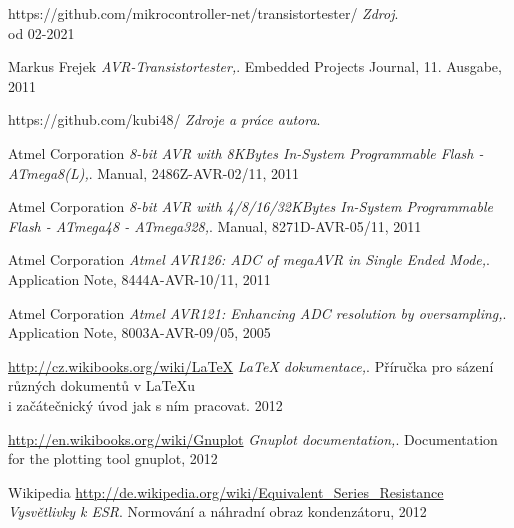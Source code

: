 \documentclass[pdftex,12pt,a4paper,oneside,czech]{report}
\begin{document}












 
 
 
 
 
 






\begin{thebibliography}{99}

https://github.com/mikrocontroller-net/transistortester/
\emph{Zdroj}.
\\od 02-2021

Markus Frejek
\emph{AVR-Transistortester,}.
Embedded Projects Journal,
11. Ausgabe,
2011

https://github.com/kubi48/
\emph{Zdroje a práce autora}.

Atmel Corporation
\emph{8-bit AVR with 8KBytes In-System Programmable Flash - ATmega8(L),}.
Manual,
2486Z-AVR-02/11,
2011

Atmel Corporation
\emph{8-bit AVR with 4/8/16/32KBytes In-System Programmable Flash - ATmega48 - ATmega328,}.
Manual,
8271D-AVR-05/11,
2011

Atmel Corporation
\emph{Atmel AVR126: ADC of megaAVR in Single Ended Mode,}.
Application Note,
8444A-AVR-10/11,
2011

Atmel Corporation
\emph{Atmel AVR121: Enhancing ADC resolution by oversampling,}.
Application Note,
8003A-AVR-09/05,
2005

\url{http://cz.wikibooks.org/wiki/LaTeX}
\emph{LaTeX dokumentace,}.
Příručka pro sázení různých dokumentů v LaTeXu\\
i  začátečnický úvod jak s ním pracovat.
2012

\url{http://en.wikibooks.org/wiki/Gnuplot}
\emph{Gnuplot documentation,}.
Documentation for the plotting tool gnuplot,
2012

Wikipedia
\url{http://de.wikipedia.org/wiki/Equivalent_Series_Resistance}
\emph{Vysvětlivky k ESR}.
Normování a náhradní obraz kondenzátoru,
2012


\end{thebibliography}
\end{document}

